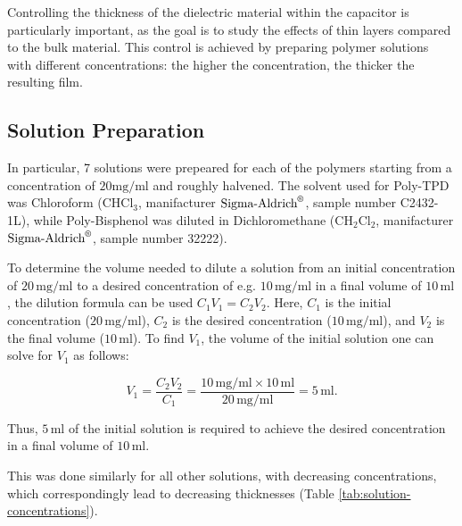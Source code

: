 Controlling the thickness of the dielectric material %
within the capacitor is particularly important, as the goal is to study the effects of thin layers compared to the bulk material. This control is achieved by preparing polymer solutions with different concentrations: the higher the concentration, the thicker the resulting film.
\subsection{Solution Preparation}

In particular, 7 solutions were prepeared for each of the polymers starting from a concentration of $20 \text{mg/ml}$
and roughly halvened.
The solvent used for Poly-TPD was Chloroform ($\text{CHCl}_3$, manifacturer $\text{Sigma-Aldrich}^{\text{\textregistered}}$, sample number C2432-1L), while Poly-Bisphenol was diluted in Dichloromethane ($\text{CH}_2\text{Cl}_2$, manifacturer $\text{Sigma-Aldrich}^{\text{\textregistered}}$, sample number 32222).


To determine the volume needed to dilute a solution from an initial concentration of \(20 \, \text{mg/ml}\) to a desired concentration of e.g. \(10 \, \text{mg/ml}\) in a final volume of \(10 \, \text{ml}\), the dilution formula can be used \(C_1 V_1 = C_2 V_2\). Here, \(C_1\) is the initial concentration (\(20 \, \text{mg/ml}\)), \(C_2\) is the desired concentration (\(10 \, \text{mg/ml}\)), and \(V_2\) is the final volume (\(10 \, \text{ml}\)). To find \(V_1\), the volume of the initial solution one can solve for \(V_1\) as follows:

\[
V_1 = \frac{C_2 V_2}{C_1} = \frac{10 \, \text{mg/ml} \times 10 \, \text{ml}}{20 \, \text{mg/ml}} = 5 \, \text{ml}.
\]

Thus, \(5 \, \text{ml}\) of the initial solution is required to achieve the desired concentration in a final volume of \(10 \, \text{ml}\).

This was done similarly for all other solutions, with decreasing concentrations, which correspondingly lead to decreasing thicknesses (Table \ref{tab:solution-concentrations}).

